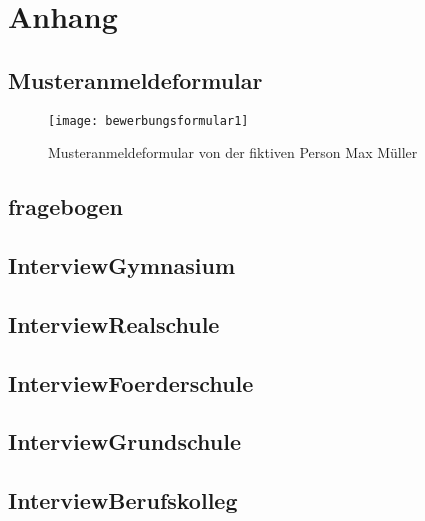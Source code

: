 
\newpage
\section{Anhang}

\subsection{Musteranmeldeformular}
\label{section-Musteranmeldeformular}
\begin{figure}[H]
    \centering
    \caption{Musteranmeldeformular von der fiktiven Person Max Müller}
    \begin{adjustbox}{height=0.85\textheight, center}
        \texttt{[image: bewerbungsformular1]}
    \end{adjustbox}
    \label{fig:anmeldeformular}
\end{figure}

\subsection{fragebogen}
\label{section-fragebogen}


\subsection{InterviewGymnasium}
\label{section-InterviewGymnasium}


\subsection{InterviewRealschule}
\label{section-InterviewRealschule}


\subsection{InterviewFoerderschule}
\label{section-InterviewFoerderschule}


\subsection{InterviewGrundschule}
\label{section-InterviewGrundschule}


\subsection{InterviewBerufskolleg}
\label{section-InterviewBerufskolleg}


